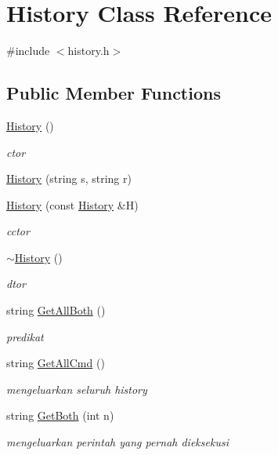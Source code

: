 \hypertarget{class_history}{\section{History Class Reference}
\label{class_history}
}


{\ttfamily \#include $<$history.\-h$>$}

\subsection*{Public Member Functions}
\begin{DoxyCompactItemize}
\item 
\hyperlink{class_history_afba1384643f419d079e78adb1497f741}{History} ()
\begin{DoxyCompactList}\small\item\em ctor \end{DoxyCompactList}\item 
\hyperlink{class_history_af05bd873be46b17f9c95e51241aa90b6}{History} (string s, string r)
\item 
\hyperlink{class_history_a1bcdcf0c6384ac7c3ecff90078aa3176}{History} (const \hyperlink{class_history}{History} \&H)
\begin{DoxyCompactList}\small\item\em cctor \end{DoxyCompactList}\item 
\hyperlink{class_history_a5b00b64a1ddee04e60d5a3b517fd6d4c}{$\sim$\-History} ()
\begin{DoxyCompactList}\small\item\em dtor \end{DoxyCompactList}\item 
string \hyperlink{class_history_ac5080f105417eafd73205340db2c9559}{Get\-All\-Both} ()
\begin{DoxyCompactList}\small\item\em predikat \end{DoxyCompactList}\item 
string \hyperlink{class_history_aaca3ead3b1339bbac0d0c2db3d326ef1}{Get\-All\-Cmd} ()
\begin{DoxyCompactList}\small\item\em mengeluarkan seluruh history \end{DoxyCompactList}\item 
string \hyperlink{class_history_a9180b02255bf0e5aa08613a9c0aa2c02}{Get\-Both} (int n)
\begin{DoxyCompactList}\small\item\em mengeluarkan perintah yang pernah dieksekusi \end{DoxyCompactList}\item 

\end{DoxyCompactItemize}
